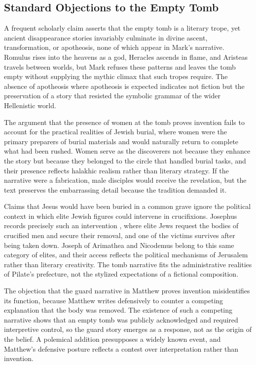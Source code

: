 \subsection{Standard Objections to the Empty Tomb}\label{subsec:empty-tomb-objections}

A frequent scholarly claim asserts that the empty tomb is a literary trope, yet ancient disappearance stories invariably culminate in divine ascent, transformation, or apotheosis, none of which appear in Mark's narrative.
Romulus rises into the heavens as a god, Heracles ascends in flame, and Aristeas travels between worlds, but Mark refuses these patterns and leaves the tomb empty without supplying the mythic climax that such tropes require.
The absence of apotheosis where apotheosis is expected indicates not fiction but the preservation of a story that resisted the symbolic grammar of the wider Hellenistic world.

The argument that the presence of women at the tomb proves invention fails to account for the practical realities of Jewish burial, where women were the primary preparers of burial materials and would naturally return to complete what had been rushed.
Women serve as the discoverers not because they enhance the story but because they belonged to the circle that handled burial tasks, and their presence reflects halakhic realism rather than literary strategy.
If the narrative were a fabrication, male disciples would receive the revelation, but the text preserves the embarrassing detail because the tradition demanded it.

Claims that Jesus would have been buried in a common grave ignore the political context in which elite Jewish figures could intervene in crucifixions.
Josephus records precisely such an intervention \cite[420--421]{josephus:life}, where elite Jews request the bodies of crucified men and secure their removal, and one of the victims survives after being taken down.
Joseph of Arimathea and Nicodemus belong to this same category of elites, and their access reflects the political mechanisms of Jerusalem rather than literary creativity.
The tomb narrative fits the administrative realities of Pilate's prefecture, not the stylized expectations of a fictional composition.

The objection that the guard narrative in Matthew proves invention misidentifies its function, because Matthew writes defensively to counter a competing explanation that the body was removed.
The existence of such a competing narrative shows that an empty tomb was publicly acknowledged and required interpretive control, so the guard story emerges as a response, not as the origin of the belief.
A polemical addition presupposes a widely known event, and Matthew's defensive posture reflects a contest over interpretation rather than invention.

